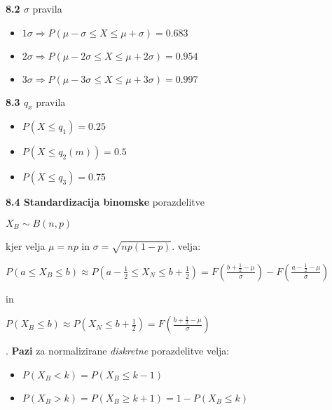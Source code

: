 \documentclass{article}
\begin{document}
\begin{multicols}{2}
	\textbf{8.2 $\sigma$}  pravila

	\begin{itemize}
		\item \begin{math}
			      1 \sigma \Rightarrow P(\mu - \sigma \leq X \leq \mu + \sigma) = 0.683
		      \end{math}

		\item \begin{math}
			      2 \sigma \Rightarrow P(\mu - 2\sigma \leq X \leq \mu + 2\sigma) = 0.954
		      \end{math}

		\item \begin{math}
			      3 \sigma \Rightarrow P(\mu - 3\sigma \leq X \leq \mu + 3\sigma) = 0.997
		      \end{math}
	\end{itemize}

	\textbf{8.3 $q_x$} pravila

	\begin{itemize}
		\item $P (X \leq q_1) = 0.25$
		\item $P (X \leq q_2(m)) = 0.5$
		\item $P (X \leq q_3) = 0.75$
	\end{itemize}

	\textbf{8.4 Standardizacija binomske} porazdelitve
	\begin{center}
		\begin{math}
			X_B \sim B(n, p)
		\end{math}
	\end{center}
	kjer velja $\mu = np$ in $\sigma = \sqrt{np(1-p)}$.
	velja:
	\begin{center}
		\begin{math}
			P(a \leq X_B \leq b) \approx P(a - \frac{1}{2} \leq X_N \leq b + \frac{1}{2})
			= F(\frac{b + \frac{1}{2} - \mu}{\sigma}) - F(\frac{a - \frac{1}{2} - \mu}{\sigma})
		\end{math}
	\end{center}
	in
	\begin{center}
		\begin{math}
			P(X_B \leq b) \approx P(X_N \leq b + \frac{1}{2}) = F(\frac{b + \frac{1}{2} - \mu}{\sigma})
		\end{math}
	\end{center}.
	\textbf{Pazi} za normalizirane \textit{diskretne} porazdelitve velja:
	\begin{itemize}
		\item $P(X_B < k) = P(X_B \leq k - 1)$
		\item $P(X_B > k) = P(X_B \geq k + 1) = 1 - P(X_B \leq k)$
	\end{itemize}



\end{multicols}
\end{document}
